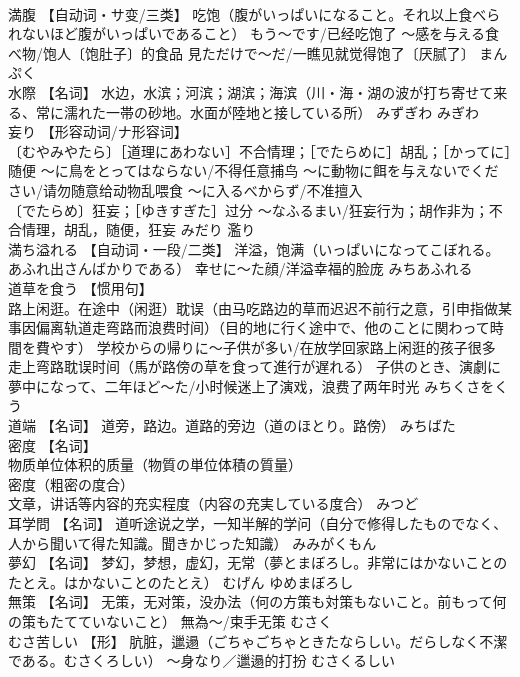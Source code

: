 \documentclass[8pt]{extreport}
\begin{document}
\begin{CJK}{UTF8}{min}
\\	満腹	【自动词・サ变/三类】 吃饱（腹がいっぱいになること。それ以上食べられないほど腹がいっぱいであること） もう～です/已经吃饱了 ～感を与える食べ物/饱人〔饱肚子〕的食品 見ただけで～だ/一瞧见就觉得饱了〔厌腻了〕	まんぷく	
\\	水際	【名词】 水边，水滨；河滨；湖滨；海滨（川・海・湖の波が打ち寄せて来る、常に濡れた一帯の砂地。水面が陸地と接している所）	みずぎわ みぎわ	
\\	妄り	【形容动词/ナ形容词】 
\\	〔むやみやたら〕［道理にあわない］不合情理；［でたらめに］胡乱；［かってに］随便 ～に鳥をとってはならない/不得任意捕鸟 ～に動物に餌を与えないでください/请勿随意给动物乱喂食 ～に入るべからず/不准擅入 
\\	〔でたらめ〕狂妄；［ゆきすぎた］过分 ～なふるまい/狂妄行为；胡作非为；不合情理，胡乱，随便，狂妄	みだり	濫り
\\	満ち溢れる	【自动词・一段/二类】 洋溢，饱满（いっぱいになってこぼれる。あふれ出さんばかりである） 幸せに～た顔/洋溢幸福的脸庞	みちあふれる	
\\	道草を食う	【惯用句】 
\\	路上闲逛。在途中（闲逛）耽误（由马吃路边的草而迟迟不前行之意，引申指做某事因偏离轨道走弯路而浪费时间）（目的地に行く途中で、他のことに関わって時間を費やす） 学校からの帰りに～子供が多い/在放学回家路上闲逛的孩子很多 
\\	走上弯路耽误时间（馬が路傍の草を食って進行が遅れる） 子供のとき、演劇に夢中になって、二年ほど～た/小时候迷上了演戏，浪费了两年时光	みちくさをくう	
\\	道端	【名词】 道旁，路边。道路的旁边（道のほとり。路傍）	みちばた	
\\	密度	【名词】 
\\	物质单位体积的质量（物質の単位体積の質量） 
\\	密度（粗密の度合） 
\\	文章，讲话等内容的充实程度（内容の充実している度合）	みつど	
\\	耳学問	【名词】 道听途说之学，一知半解的学问（自分で修得したものでなく、人から聞いて得た知識。聞きかじった知識）	みみがくもん	
\\	夢幻	【名词】 梦幻，梦想，虚幻，无常（夢とまぼろし。非常にはかないことのたとえ。はかないことのたとえ）	むげん ゆめまぼろし	
\\	無策	【名词】 无策，无对策，没办法（何の方策も対策もないこと。前もって何の策もたてていないこと） 無為～/束手无策	むさく	
\\	むさ苦しい	【形】 肮脏，邋遢（ごちゃごちゃときたならしい。だらしなく不潔である。むさくろしい） ～身なり／邋遢的打扮	むさくるしい	

\end{CJK}
\end{document}
